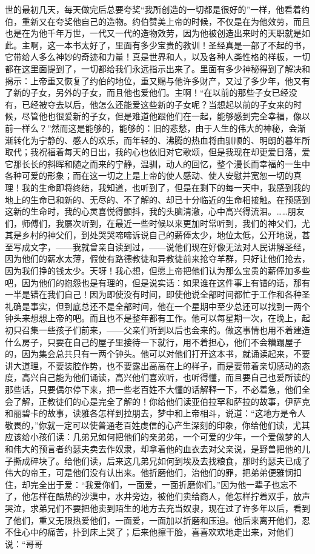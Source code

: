 世的最初几天，每天做完后总要夸奖“我所创造的一切都是很好的”一样，他看着约伯，重新又在夸奖他自己的造物。约伯赞美上帝的时候，不仅是在为他效劳，而且也是在为他千年万世，一代又一代的造物效劳，因为他被创造出来时的天职就是如此。主啊，这一本书太好了，里面有多少宝贵的教训！圣经真是一部了不起的书，它带给人多么神妙的奇迹和力量！真是世界和人，以及各种人类性格的样板，一切都在这里面提到了，一切都给我们永远指示出来了。里面有多少神秘得到了解决和揭示：上帝重又恢复了约伯的地位，重又赐与他许多财产，又过了多少年，他又有了新的子女，另外的子女，而且他也爱他们。主啊！“在以前的那些子女已经没有，已经被夺去以后，他怎么还能爱这些新的子女呢？当想起以前的子女来的时候，尽管他也很爱新的子女，但是难道他跟他们在一起，能够感到完全幸福，像以前一样么？”然而这是能够的，能够的：旧的悲愁，由于人生的伟大的神秘，会渐渐转化为宁静的、感人的欢乐，而年轻的、沸腾的热血将由驯顺的、明朗的暮年所取代；我祝福着每天的日出，我的心也依旧对它歌颂，但是我现在却更爱日落，爱它那长长的斜晖和随之而来的宁静，温驯，动人的回忆，整个漫长而幸福的一生中各种可爱的形象；而在这一切之上是上帝的使人感动、使人安慰并宽恕一切的真理！我的生命即将终结，我知道，也听到了，但是在剩下的每一天中，我感到我的地上的生命已和新的、无尽的、不了解的、却已十分临近的生命相接触。在预感到这新的生命时，我的心灵喜悦得颤抖，我的头脑清澈，心中高兴得流泪。……朋友们，师傅们，我屡次听到，在最近一些时候以来更加时常听到，我们的神父们，尤其是乡村的神父们，到处哭哭啼啼诉说自己的薪俸太少，地位太低，公开地说，甚至写成文字，——我就曾亲自读到过，——说他们现在好像无法对人民讲解圣经，因为他们的薪水太薄，假使有路德教徒和异教徒前来抢夺羊群，只好让他们抢去，因为我们挣的钱太少。天呀！我心想，但愿上帝把他们认为那么宝贵的薪俸加多些吧，因为他们的抱怨也是有理的，但是说实话：如果谁在这件事上有错的话，那有一半是错在我们自己！因为即使没有时间，即使他说全部时间都忙于工作和各种圣礼确是事实，但到底总还不是全部时间，他在一个星期中至少总还可以找到一两个钟头来想想上帝的吧。而且也不是整年都有工作。他可以每星期一次，在晚上，起初只召集一些孩子们前来，——父亲们听到以后也会来的。做这事情也用不着建造什么房子，只要在自己的屋子里接待一下就行，用不着担心，他们不会糟蹋屋子的，因为集会总共只有一两个钟头。他可以对他们打开这本书，就诵读起来，不要讲大道理，不要装腔作势，也不要露出高高在上的样子，而是要带着亲切感动的态度，高兴自己能为他们诵读，高兴他们喜欢听，也听得懂，而且要自己也爱所读的那些话，只要偶尔停下来，把一些老百姓不大懂的话解释一下，不必着急，他们全会了解，正教徒们的心是完全了解的！你给他们读亚伯拉罕和萨拉的故事，伊萨克和丽碧卡的故事，读雅各怎样到拉朋去，梦中和上帝相斗，说道：“这地方是令人敬畏的，”你就一定可以使普通老百姓虔信的心产生深刻的印象，你给他们读，尤其应该给小孩们读：几弟兄如何把他们的亲弟弟，一个可爱的少年，一个爱做梦的人和伟大的预言者约瑟夫卖去作奴隶，却拿着他的血衣去对父亲说，是野兽把他的儿子撕成碎块了。给他们读，后来这几弟兄如何到埃及去找粮食，那时约瑟夫已成了伟大的帝王，可是他们没有认出来。他折磨他们，治他们的罪，把弟弟便雅悯扣住，却完全出于爱：“我爱你们，一面爱，一面折磨你们。”因为他一辈子也忘不了，他怎样在酷热的沙漠中，水井旁边，被他们卖给商人，他怎样拧着双手，放声哭泣，求弟兄们不要把他卖到陌生的地方去充当奴隶，现在过了许多年以后，看到了他们，重又无限热爱他们，一面爱，一面加以折磨和压迫。他后来离开他们，忍不住心中的痛苦，扑到床上哭了；后来他擦干脸，喜喜欢欢地走出来，对他们说：“哥哥